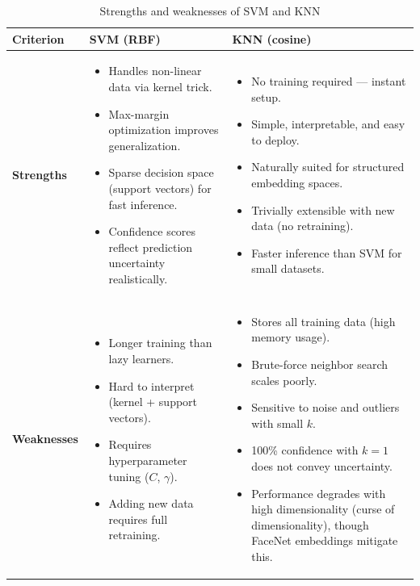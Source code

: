 \documentclass[12pt,a4paper]{article}
\begin{document}
\begin{table}[H]
    \centering
    \caption{Strengths and weaknesses of SVM and KNN}
    \label{tab:swot}
    \begin{tabular}{p{3.5cm} p{5.5cm} p{5.5cm}}
        \toprule
        \textbf{Criterion} & \textbf{SVM (RBF)} & \textbf{KNN (cosine)} \\
        \midrule
        \textbf{Strengths} &
        \begin{itemize}
            \item Handles non-linear data via kernel trick.
            \item Max-margin optimization improves generalization.
            \item Sparse decision space (support vectors) for fast inference.
            \item Confidence scores reflect prediction uncertainty realistically.
        \end{itemize} &
        \begin{itemize}
            \item No training required --- instant setup.
            \item Simple, interpretable, and easy to deploy.
            \item Naturally suited for structured embedding spaces.
            \item Trivially extensible with new data (no retraining).
            \item Faster inference than SVM for small datasets.
        \end{itemize} \\
        \midrule
        \textbf{Weaknesses} &
        \begin{itemize}
            \item Longer training than lazy learners.
            \item Hard to interpret (kernel + support vectors).
            \item Requires hyperparameter tuning ($C$, $\gamma$).
            \item Adding new data requires full retraining.
        \end{itemize} &
        \begin{itemize}
            \item Stores all training data (high memory usage).
            \item Brute-force neighbor search scales poorly.
            \item Sensitive to noise and outliers with small $k$.
            \item 100\% confidence with $k=1$ does not convey uncertainty.
            \item Performance degrades with high dimensionality (curse of dimensionality), though FaceNet embeddings mitigate this.
        \end{itemize} \\
        \bottomrule
    \end{tabular}
\end{table}
\end{document}
